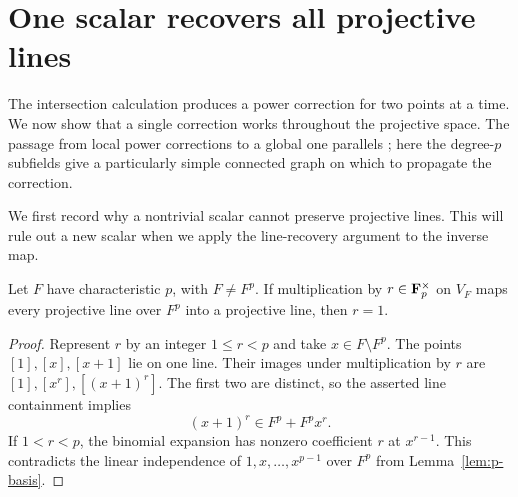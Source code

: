 \section{One scalar recovers all projective lines}\label{sec:lines}

The intersection calculation produces a power correction for two points at
a time.  We now show that a single correction works throughout the
projective space.  The passage from local power corrections to a global
one parallels \citet[Section~3.5]{CadoretPirutka2021}; here the degree-$p$
subfields give a particularly simple connected graph on which to propagate
the correction.

We first record why a nontrivial scalar cannot preserve projective lines.
This will rule out a new scalar when we apply the line-recovery argument
to the inverse map.

\begin{lemma}\label{lem:scalar-line}
Let $F$ have characteristic $p$, with $F\ne F^p$.  If multiplication by
$r\in\mathbf F_p^\times$ on $V_F$ maps every projective line over $F^p$ into a
projective line, then $r=1$.
\end{lemma}
\begin{proof}
Represent $r$ by an integer $1\le r<p$ and take $x\in F\setminus F^p$.
The points $[1],[x],[x+1]$ lie on one line.  Their images under
multiplication by $r$ are $[1],[x^r],[(x+1)^r]$.  The first two are
distinct, so the asserted line containment implies
\[
 (x+1)^r\in F^p+F^p x^r.
\]
If $1<r<p$, the binomial expansion has nonzero coefficient $r$ at
$x^{r-1}$.  This contradicts the linear independence of
$1,x,\ldots,x^{p-1}$ over $F^p$ from Lemma~\ref{lem:p-basis}.
\end{proof}

